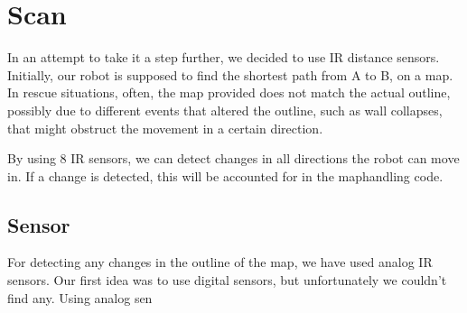 \chapter{Scan}\label{ch:scan}
In an attempt to take it a step further, we decided to use IR distance sensors. 
Initially, our robot is supposed to find the 
shortest path from A to B, on a map. 
In rescue situations, often, the map provided does not match 
the actual outline, possibly due to different events that 
altered the outline, such as wall collapses, that might 
obstruct the movement in a certain direction.

By using 8 IR sensors, we can detect changes in all directions 
the robot can move in. If a change is detected, this will be
accounted for in the maphandling code.

\section{Sensor}\label{sec:sensor}
For detecting any changes in the outline of the map, we have 
used analog IR sensors. Our first idea was to use digital
sensors, but unfortunately we couldn't find any. Using analog sen